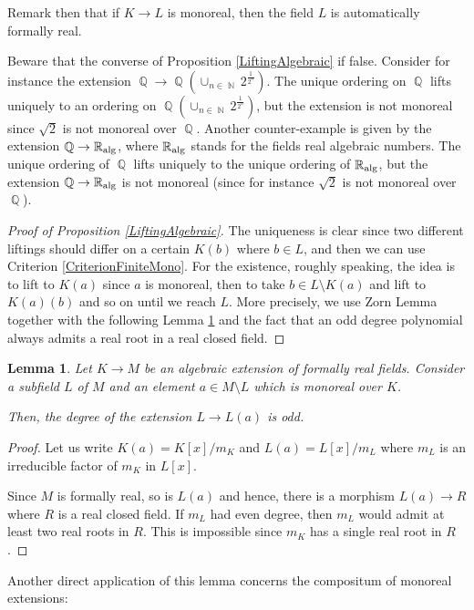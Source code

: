 \documentclass[12pt]{amsart}
\newtheorem{lem}[thm]{Lemma}
\theoremstyle{definition}
\DeclareMathOperator{\NN}{\mathbb N}
\DeclareMathOperator{\QQ}{\mathbb Q}
\def \RR {{\mathbb R}}
\begin{document}
Remark then that if $K\to L$ is monoreal, then the field $L$ is automatically formally real.

Beware that the converse of Proposition \ref{LiftingAlgebraic} if false. Consider for instance the extension 
$\QQ\to \QQ(\cup_{n\in\NN}2^{\frac{1}{2^n}})$. The unique ordering on $\QQ$ lifts uniquely to an ordering on $\QQ(\cup_{n\in\NN}2^{\frac{1}{2^n}})$, but the extension is not monoreal since $\sqrt{2}$ is not monoreal over $\QQ$.
Another counter-example is given by the extension $\QQ\to \RR_{\rm{alg}}$, where $\RR_{\rm{alg}}$ stands for the fields real algebraic numbers.
The unique ordering of $\QQ$ lifts uniquely to the unique ordering of $\RR_{\rm{alg}}$, but the extension $\QQ\to \RR_{\rm{alg}}$ is not monoreal (since for instance $\sqrt{2}$ is not monoreal over $\QQ$). 


\begin{proof}[Proof of Proposition \ref{LiftingAlgebraic}]
	The uniqueness is clear since two different liftings should differ on a certain $K(b)$ where $b\in L$, and then we can use Criterion \ref{CriterionFiniteMono}.	
	For the existence, 
roughly speaking, the idea is to lift to $K(a)$ since $a$ is monoreal, then to take $b\in L\setminus K(a)$ and lift to $K(a)(b)$ and so on until we reach $L$. More precisely, we use Zorn Lemma together with the following Lemma \ref{MonorealDiag} and the fact that an odd degree polynomial always admits a real root in a real closed field.
\end{proof}

\begin{lem}\label{MonorealDiag}
	Let $K\to M$ be an algebraic extension of formally real fields. Consider a subfield $L$ of $M$ and an element $a\in M\setminus L$ which is monoreal over $K$.
		
	Then, the degree of the extension $L\to L(a)$ is odd.
\end{lem}	

\begin{proof}
Let us write $K(a)=K[x]/m_K$ and $L(a)=L[x]/m_L$ where $m_L$ is an irreducible factor of $m_K$ in $L[x]$.

Since $M$ is formally real, so is $L(a)$ and hence, there is a morphism $L(a)\to R$ where $R$ is a real closed field. If $m_L$ had even degree, then $m_L$ would admit at least two real roots in $R$. This is impossible since $m_K$ has a single real root in $R$.
\end{proof}

Another direct application of this lemma concerns the compositum of monoreal extensions:
\end{document}
